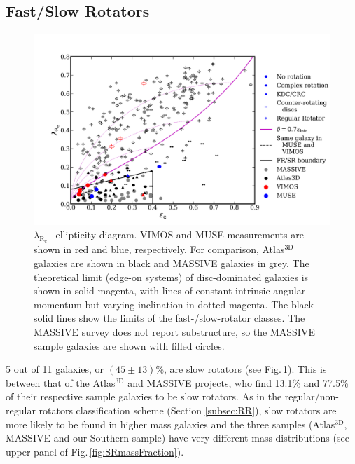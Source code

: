 \documentclass[a4paper,fleqn,usenatbib]{mnras}
\begin{document}
	\subsection{Fast/Slow Rotators}
		\begin{figure}
			\includegraphics[width=\columnwidth]{lambda_R_ellipticity.png}
			\caption{$\lambda_\mathrm{R_e}$\,--\,ellipticity diagram. VIMOS and MUSE measurements are shown in red and blue, respectively. For comparison, Atlas$^\text{3D}$ galaxies \citep{Emsellem2011} are shown in black and MASSIVE galaxies \citep{Veale2017} in grey. The theoretical limit (edge-on systems) of disc-dominated galaxies is shown in solid magenta, with lines of constant intrinsic angular momentum but varying inclination in dotted magenta. The black solid lines show the limits of the fast-/slow-rotator classes. The MASSIVE survey does not report substructure, so the MASSIVE sample galaxies are shown with filled circles.}
			\label{fig:lambdaR_ellip}
		\end{figure}


		5 out of 11 galaxies, or $(45\pm13)$\%, are slow rotators (see Fig.\,\ref{fig:lambdaR_ellip}). This is between that of the Atlas$^\text{3D}$ and MASSIVE projects, who find 13.1\% and 77.5\% of their respective sample galaxies to be slow rotators. As in the regular/non-regular rotators classification scheme (Section \ref{subsec:RR}), slow rotators are more likely to be found in higher mass galaxies and the three samples (Atlas$^\text{3D}$, MASSIVE and our Southern sample) have very different mass distributions (see upper panel of Fig.\,\ref{fig:SRmassFraction}).
\end{document}
